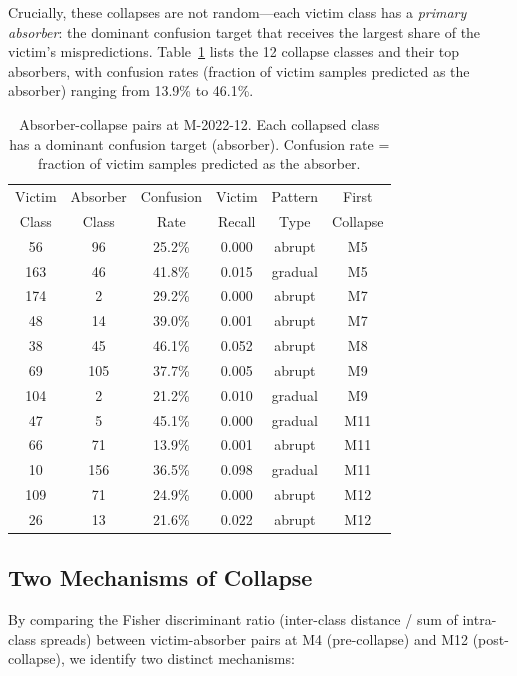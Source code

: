 \documentclass[journal]{IEEEtran}
\begin{document}
Crucially, these collapses are not random---each victim class has a \textit{primary absorber}: the dominant confusion target that receives the largest share of the victim's mispredictions.
Table~\ref{tab:absorber_pairs} lists the 12 collapse classes and their top absorbers, with confusion rates (fraction of victim samples predicted as the absorber) ranging from 13.9\% to 46.1\%.

\begin{table}[t]
\centering
\caption{Absorber-collapse pairs at M-2022-12. Each collapsed class has a dominant confusion target (absorber). Confusion rate = fraction of victim samples predicted as the absorber.}
\label{tab:absorber_pairs}
\small
\begin{tabular}{@{}cccccc@{}}
\toprule
Victim & Absorber & Confusion & Victim & Pattern & First \\
Class  & Class    & Rate      & Recall & Type    & Collapse \\
\midrule
56  & 96  & 25.2\% & 0.000 & abrupt  & M5 \\
163 & 46  & 41.8\% & 0.015 & gradual & M5 \\
174 & 2   & 29.2\% & 0.000 & abrupt  & M7 \\
48  & 14  & 39.0\% & 0.001 & abrupt  & M7 \\
38  & 45  & 46.1\% & 0.052 & abrupt  & M8 \\
69  & 105 & 37.7\% & 0.005 & abrupt  & M9 \\
104 & 2   & 21.2\% & 0.010 & gradual & M9 \\
47  & 5   & 45.1\% & 0.000 & gradual & M11 \\
66  & 71  & 13.9\% & 0.001 & abrupt  & M11 \\
10  & 156 & 36.5\% & 0.098 & gradual & M11 \\
109 & 71  & 24.9\% & 0.000 & abrupt  & M12 \\
26  & 13  & 21.6\% & 0.022 & abrupt & M12 \\
\bottomrule
\end{tabular}
\end{table}

\subsection{Two Mechanisms of Collapse}
\label{sec:mechanisms}

By comparing the Fisher discriminant ratio (inter-class distance / sum of intra-class spreads) between victim-absorber pairs at M4 (pre-collapse) and M12 (post-collapse), we identify two distinct mechanisms:
\end{document}
